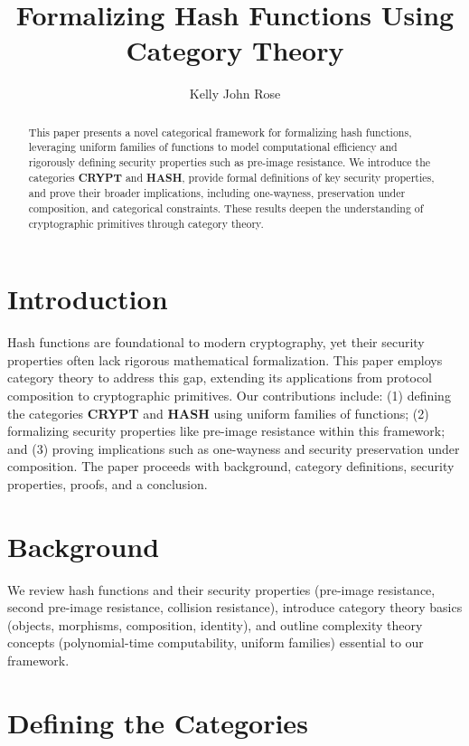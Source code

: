 \documentclass{article}
\theoremstyle{plain}
\begin{document}
\title{Formalizing Hash Functions Using Category Theory}
\author{Kelly John Rose}
\date{}
\maketitle

\begin{abstract}
This paper presents a novel categorical framework for formalizing hash functions, leveraging uniform families of functions to model computational efficiency and rigorously defining security properties such as pre-image resistance. We introduce the categories \textbf{CRYPT} and \textbf{HASH}, provide formal definitions of key security properties, and prove their broader implications, including one-wayness, preservation under composition, and categorical constraints. These results deepen the understanding of cryptographic primitives through category theory.
\end{abstract}

\section{Introduction}
Hash functions are foundational to modern cryptography, yet their security properties often lack rigorous mathematical formalization. This paper employs category theory to address this gap, extending its applications from protocol composition to cryptographic primitives. Our contributions include: (1) defining the categories \textbf{CRYPT} and \textbf{HASH} using uniform families of functions; (2) formalizing security properties like pre-image resistance within this framework; and (3) proving implications such as one-wayness and security preservation under composition. The paper proceeds with background, category definitions, security properties, proofs, and a conclusion.

\section{Background}
We review hash functions and their security properties (pre-image resistance, second pre-image resistance, collision resistance), introduce category theory basics (objects, morphisms, composition, identity), and outline complexity theory concepts (polynomial-time computability, uniform families) essential to our framework.

\section{Defining the Categories}
\end{document}
